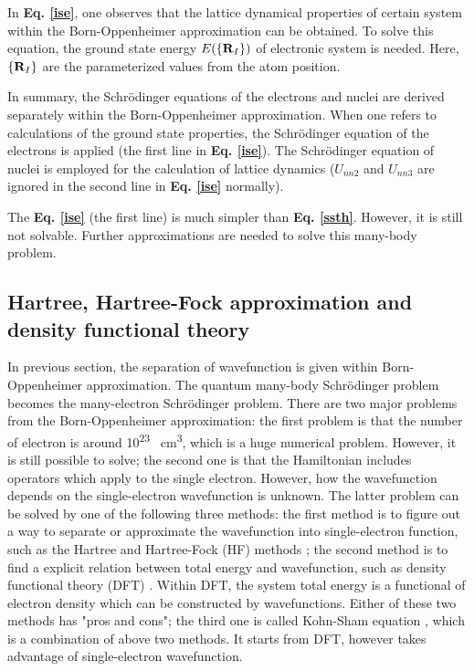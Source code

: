 \documentclass[a4paper, 12pt, titlepage,oneside,drop]{kthesis}
\begin{document}
In \textbf{Eq. \ref{ise}}, one observes that the lattice dynamical properties of certain system within the Born-Oppenheimer approximation can be obtained. To solve this equation,
the ground state energy $E(\{{{\textbf R}_{I}}\})$ of electronic system is needed. Here, $\{{\textbf R}_{I}\}$ are the parameterized values from the atom position.
 
In summary, the Schrödinger equations of the electrons and nuclei are derived separately within the Born-Oppenheimer approximation. When one refers to calculations of the ground state properties,
the Schrödinger equation of the electrons is applied (the first line in \textbf{Eq. \ref{ise}}). The Schrödinger equation of nuclei is employed for the calculation of lattice dynamics 
($U_{nn2}$ and $U_{nn3}$ are ignored \cite{clasdft} in the second line in \textbf{Eq. \ref{ise}} normally).

The \textbf{Eq. \ref{ise}} (the first line) is much simpler than \textbf{Eq. \ref{ssth}}. However, it is still not solvable. Further approximations  are needed
to solve this many-body problem.

\subsection{Hartree, Hartree-Fock approximation and density functional theory}

In previous section, the separation of wavefunction is given within Born-Oppenheimer approximation. The quantum many-body Schrödinger problem becomes the many-electron 
Schrödinger problem. There are two major problems from the Born-Oppenheimer approximation: the first problem is that the number of electron is around 10\textsuperscript{23} \si{\per\cubic\centi\metre}, which is a huge numerical 
problem. However, it is still possible to solve; the second one is that the Hamiltonian includes operators which apply to the single electron. However, how the wavefunction depends on the single-electron wavefunction is unknown.
The latter problem can be solved by one of the following three methods: the first method is to figure out a way to separate or approximate the wavefunction into single-electron function, such as the Hartree and Hartree-Fock (HF)
methods \cite{hartreeapproximation,hartreefockapproximation}; the second method is to find a explicit relation between total energy and wavefunction, such as density functional theory (DFT) \cite{hohenberg1964inhomogeneous}. Within DFT, the system total energy is a functional of electron density which can be 
constructed by wavefunctions. Either of these two methods has "pros and cons"; the third one is called Kohn-Sham equation \cite{kohn1965self}, which is a combination of above two methods. It starts from DFT, however takes advantage of single-electron 
wavefunction.
\end{document}
